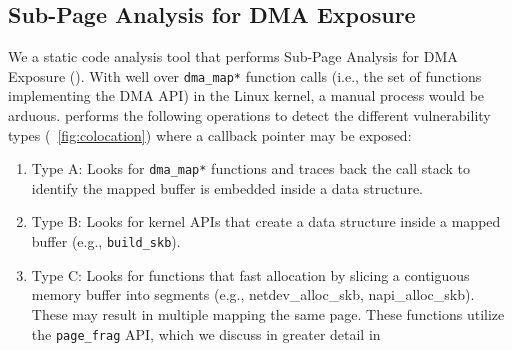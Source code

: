 \subsection{Sub-Page Analysis for DMA Exposure}\label{sec:static-analysis}

We \DIFdelbegin {}\DIFdelend \DIFaddbegin {}\DIFaddend a static code analysis tool that performs Sub-Page Analysis for DMA Exposure (\tool). With well over \DIFdelbegin {} \texttt{dma\_map*} function calls (i.e., the set of functions implementing the DMA API) \DIFdelbegin \DIFdel{, }\DIFdelend in the Linux kernel, a manual process would be arduous. \tool performs the following operations to detect the different \subpage{} vulnerability types (\DIFdelbegin {}\DIFdelend \DIFaddbegin {}\DIFaddend ~\ref{fig:colocation}) where a callback pointer may be exposed:
\begin{enumerate}
    \item Type A: Looks for \texttt{dma\_map*} functions and traces back the call stack to identify \DIFdelbegin {}\DIFdelend \DIFaddbegin {}\DIFaddend the mapped buffer is embedded inside a data structure.
    \item Type B: Looks for kernel APIs that create a data structure inside a mapped buffer (e.g., \texttt{build\_skb}).
    \item Type C: Looks for functions that \DIFdelbegin {}\DIFdelend \DIFaddbegin {}\DIFaddend fast allocation by slicing a contiguous memory buffer into segments (e.g., netdev\_alloc\_skb, napi\_alloc\_skb). These may result in multiple \iova mapping the same page. These functions utilize the \texttt{page\_frag} API, which we discuss in greater detail in \DIFdelbegin {}\DIFdelend \DIFaddbegin {}\DIFaddend \end{enumerate}



